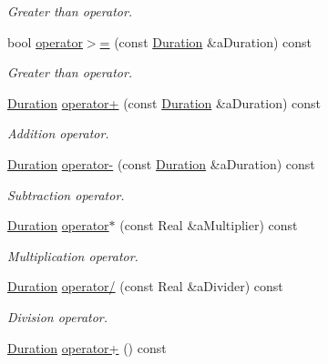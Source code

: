 \begin{DoxyCompactItemize}
\begin{DoxyCompactList}\small\item\em Greater than operator. \end{DoxyCompactList}\item 
bool \hyperlink{classostk_1_1physics_1_1time_1_1_duration_a3c742aac8e660effd3575fe0ca570d75}{operator$>$=} (const \hyperlink{classostk_1_1physics_1_1time_1_1_duration}{Duration} \&a\+Duration) const
\begin{DoxyCompactList}\small\item\em Greater than operator. \end{DoxyCompactList}\item 
\hyperlink{classostk_1_1physics_1_1time_1_1_duration}{Duration} \hyperlink{classostk_1_1physics_1_1time_1_1_duration_a26a68103c9ee563c99257590fbc60079}{operator+} (const \hyperlink{classostk_1_1physics_1_1time_1_1_duration}{Duration} \&a\+Duration) const
\begin{DoxyCompactList}\small\item\em Addition operator. \end{DoxyCompactList}\item 
\hyperlink{classostk_1_1physics_1_1time_1_1_duration}{Duration} \hyperlink{classostk_1_1physics_1_1time_1_1_duration_a211f0f909d453c61aad6677409507698}{operator-\/} (const \hyperlink{classostk_1_1physics_1_1time_1_1_duration}{Duration} \&a\+Duration) const
\begin{DoxyCompactList}\small\item\em Subtraction operator. \end{DoxyCompactList}\item 
\hyperlink{classostk_1_1physics_1_1time_1_1_duration}{Duration} \hyperlink{classostk_1_1physics_1_1time_1_1_duration_afca79b9de1ea487b00abdb8be8c5608d}{operator$\ast$} (const Real \&a\+Multiplier) const
\begin{DoxyCompactList}\small\item\em Multiplication operator. \end{DoxyCompactList}\item 
\hyperlink{classostk_1_1physics_1_1time_1_1_duration}{Duration} \hyperlink{classostk_1_1physics_1_1time_1_1_duration_a2400f4ac59f56e2a73090cff9404c67c}{operator/} (const Real \&a\+Divider) const
\begin{DoxyCompactList}\small\item\em Division operator. \end{DoxyCompactList}\item 
\hyperlink{classostk_1_1physics_1_1time_1_1_duration}{Duration} \hyperlink{classostk_1_1physics_1_1time_1_1_duration_a172bf36df42a169ecf5893daa3f7d7b2}{operator+} () const

\end{DoxyCompactItemize}
